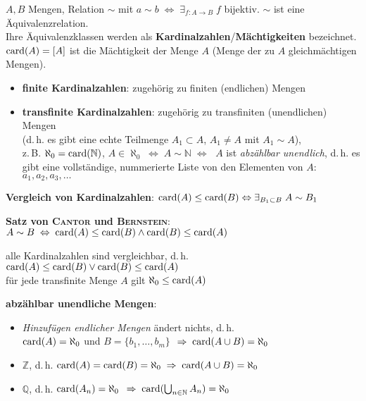 $A, B$ Mengen, Relation $\sim$ mit
$a \sim b \;\Leftrightarrow\; \exists_{f: A \rightarrow B}\; f$ bijektiv.
$\sim$ ist eine Äquivalenzrelation. \\
Ihre Äquivalenzklassen werden als
\textbf{Kardinalzahlen}/\textbf{Mächtigkeiten} bezeichnet. \\
$\operatorname{card}(A) = [A]$ ist die Mächtigkeit der Menge $A$ (Menge der zu
$A$ gleichmächtigen Mengen).

\begin{itemize}
    \item \textbf{finite Kardinalzahlen}: zugehörig zu finiten (endlichen)
    Mengen
    
    \item \textbf{transfinite Kardinalzahlen}: zugehörig zu transfiniten
    (unendlichen) Mengen \\
    (d.\,h. es gibt eine echte Teilmenge $A_1 \subset A$, $A_1 \not= A$
    mit $A_1 \sim A$), \\
    z.\,B. $\aleph_0 = \operatorname{card}(\mathbb{N})$,
    $A \in \aleph_0 \;\Leftrightarrow\; A \sim \mathbb{N} \;\Leftrightarrow\;$
    $A$ ist \emph{abzählbar unendlich}, d.\,h. es gibt eine vollständige,
    nummerierte Liste von den Elementen von $A$: $a_1, a_2, a_3, \ldots$
\end{itemize}

\textbf{Vergleich von Kardinalzahlen}:
$\operatorname{card}(A) \le \operatorname{card}(B) \Leftrightarrow
\exists_{B_1 \subset B}\; A \sim B_1$

\textbf{Satz von \textsc{Cantor} und \textsc{Bernstein}}:
$A \sim B \;\Leftrightarrow\; \operatorname{card}(A) \le \operatorname{card}(B)
\land \operatorname{card}(B) \le \operatorname{card}(A)$

alle Kardinalzahlen sind vergleichbar, d.\,h.
$\operatorname{card}(A) \le \operatorname{card}(B)
\lor \operatorname{card}(B) \le \operatorname{card}(A)$ \\
für jede transfinite Menge $A$ gilt $\aleph_0 \le \operatorname{card}(A)$

\textbf{abzählbar unendliche Mengen}:

\begin{itemize}
    \item \emph{Hinzufügen endlicher Mengen} ändert nichts, d.\,h. \\
    $\operatorname{card}(A) = \aleph_0$ und $B = \{b_1, \ldots, b_m\}$
    $\;\Rightarrow\; \operatorname{card}(A \cup B) = \aleph_0$
    
    \item $\mathbb{Z}$, d.\,h.
    $\operatorname{card}(A) = \operatorname{card}(B) = \aleph_0 \;\Rightarrow\; \operatorname{card}(A \cup B) = \aleph_0$
    
    \item $\mathbb{Q}$, d.\,h. $\operatorname{card}(A_n) = \aleph_0$
    $\;\Rightarrow\; \operatorname{card}(\bigcup_{n \in \mathbb{N}} A_n) = \aleph_0$
\end{itemize}

